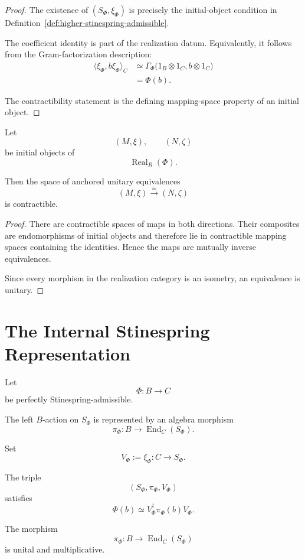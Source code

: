 \begin{proof}
The existence of \((S_\Phi,\xi_\Phi)\) is precisely the initial-object
condition in
Definition~\ref{def:higher-stinespring-admissible}.

The coefficient identity is part of the realization datum. Equivalently, it
follows from the Gram-factorization description:
\[
\begin{aligned}
  \langle\xi_\Phi,b\xi_\Phi\rangle_C
  &\simeq
  \Gamma_\Phi
  \bigl(
    1_B\otimes1_C,
    b\otimes1_C
  \bigr)
  \\
  &=
  \Phi(b).
\end{aligned}
\]

The contractibility statement is the defining mapping-space property of an
initial object.
\end{proof}

\begin{corollary}
\label{cor:higher-minimal-unitary-uniqueness}
Let
\[
  (M,\xi),
  \qquad
  (N,\zeta)
\]
be initial objects of
\[
  \operatorname{Real}_R(\Phi).
\]

Then the space of anchored unitary equivalences
\[
  (M,\xi)
  \xrightarrow{\simeq}
  (N,\zeta)
\]
is contractible.
\end{corollary}

\begin{proof}
There are contractible spaces of maps in both directions. Their composites
are endomorphisms of initial objects and therefore lie in contractible mapping
spaces containing the identities. Hence the maps are mutually inverse
equivalences.

Since every morphism in the realization category is an isometry, an
equivalence is unitary.
\end{proof}

\section{The Internal Stinespring Representation}
\label{sec:higher-internal-stinespring-representation}

Let
\[
  \Phi:B\to C
\]
be perfectly Stinespring-admissible.

The left \(B\)-action on \(S_\Phi\) is represented by an algebra morphism
\[
  \pi_\Phi:
  B
  \longrightarrow
  \operatorname{End}_C(S_\Phi).
\]

Set
\[
  V_\Phi:=\xi_\Phi:C\to S_\Phi.
\]

\begin{theorem}
\label{thm:higher-internal-stinespring-formula}
The triple
\[
  (S_\Phi,\pi_\Phi,V_\Phi)
\]
satisfies
\[
  \Phi(b)
  \simeq
  V_\Phi^\dagger
  \pi_\Phi(b)
  V_\Phi.
\]

The morphism
\[
  \pi_\Phi:
  B\to\operatorname{End}_C(S_\Phi)
\]
is unital and multiplicative.
\end{theorem}

